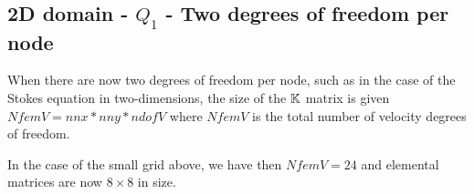 \subsection{2D domain - $Q_1$ - Two degrees of freedom per node}

When there are now two degrees of freedom per node, such as in the case 
of the Stokes equation in two-dimensions, the size of the ${\mathbb{K}}$ matrix 
is given $NfemV=nnx*nny*ndofV$ where $NfemV$ is the total number of 
velocity degrees of freedom.

\begin{center}

\end{center}

In the case of the small grid above, we have then $NfemV=24$ and
elemental matrices are now $8\times8$ in size.


